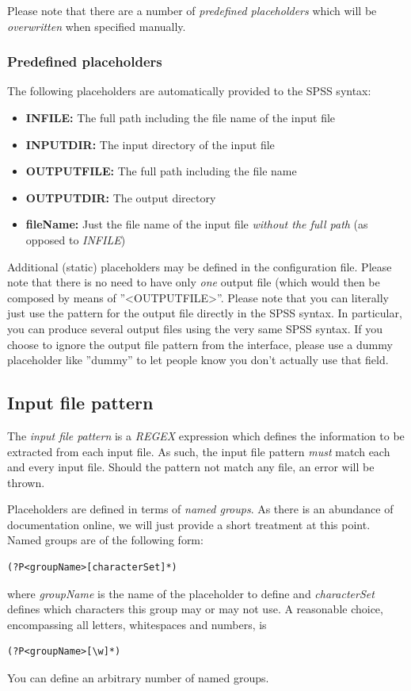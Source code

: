 \documentclass[]{article}
\newcommand{\ph}[1]{{\textless}#1{\textgreater}}
\begin{document}
Please note that there are a number of \textit{predefined placeholders} which will be \textit{overwritten} when specified manually.

\subsubsection{Predefined placeholders}
The following placeholders are automatically provided to the SPSS syntax:
\begin{itemize}[noitemsep]
	\item \textbf{INFILE:} The full path including the file name of the input file
	\item \textbf{INPUTDIR:} The input directory of the input file
	\item \textbf{OUTPUTFILE:} The full path including the file name
	\item \textbf{OUTPUTDIR:} The output directory 
	\item \textbf{fileName:} Just the file name of the input file \textit{without the full path} (as opposed to \textit{INFILE})
\end{itemize}

Additional (static) placeholders may be defined in the configuration file. 
Please note that there is no need to have only \textit{one} output file (which would then be composed by  means of ''\ph{OUTPUTFILE}''. Please note that you can literally just use the pattern for the output file directly in the SPSS syntax. In particular, you can produce several output files using the very same SPSS syntax. 
If you choose to ignore the output file pattern from the interface, please use a dummy placeholder like ''dummy'' to let people know you don't actually use that field.  


\subsection{Input file pattern}
The \textit{input file pattern} is a \textit{REGEX} expression which defines the information to be extracted from each input file. As such, the input file pattern \textit{must} match each and every input file. Should the pattern not match any file, an error will be thrown. 

Placeholders are defined in terms of \textit{named groups}. As there is an abundance of documentation online, we will just provide a short treatment at this point. 
Named groups are of the following form:
\begin{verbatim}
(?P<groupName>[characterSet]*)
\end{verbatim}
where \textit{groupName} is the name of the placeholder to define and \textit{characterSet} defines which characters this group may or may not use. A reasonable choice, encompassing all letters, whitespaces and numbers, is 
\begin{verbatim}
(?P<groupName>[\w]*)
\end{verbatim}
You can define an arbitrary number of named groups. 
\end{document}
